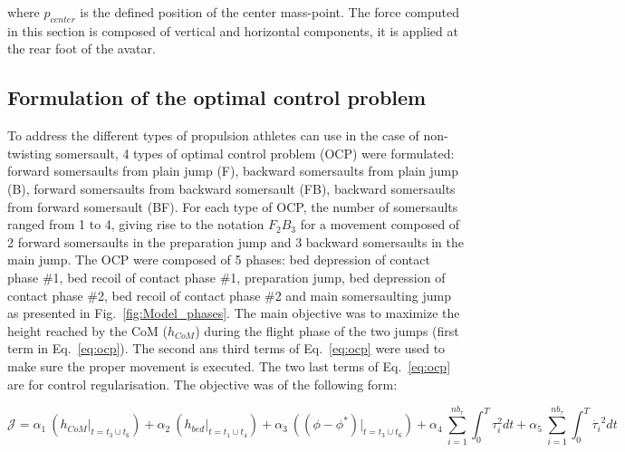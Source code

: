 \noindent where $p_{center}$ is the defined position of the center mass-point.
The force computed in this section is composed of vertical and horizontal components, it is applied at the rear foot of the avatar.




\subsection{Formulation of the optimal control problem}\label{subsec:2e}
To address the different types of propulsion athletes can use in the case of non-twisting somersault, 4 types of optimal control problem (OCP) were formulated: forward somersaults from plain jump (F), backward somersaults from plain jump (B), forward somersaults from backward somersault (FB), backward somersaults from forward somersault (BF).
For each type of OCP, the number of somersaults ranged from 1 to 4, giving rise to the notation $F_2B_3$ for a movement composed of 2 forward somersaults in the preparation jump and 3 backward somersaults in the main jump.
The OCP were composed of 5 phases: bed depression of contact phase \#1, bed recoil of contact phase \#1, preparation jump, bed depression of contact phase \#2, bed recoil of contact phase \#2 and main somersaulting jump as presented in Fig.~\ref{fig:Model_phases}.
The main objective was to maximize the height reached by the CoM ($h_{CoM}$) during the flight phase of the two jumps (first term in Eq.~\ref{eq:ocp}).
The second ans third terms of Eq.~\ref{eq:ocp} were used to make sure the proper movement is executed.
The two last terms of Eq.~\ref{eq:ocp} are for control regularisation.
The objective was of the following form:

\[
\mathcal{J} = \alpha_1~(h_{CoM} \big\rvert_{t = t_3 \cup t_6}) + \alpha_2~(h_{bed} \big\rvert_{t = t_1 \cup t_4}) + \alpha_3~((\phi - \phi^*) \big\rvert_{t = t_3 \cup t_6}) + \alpha_4~\sum_{i=1}^{nb_{\tau}} \int_0^T \tau_{i}^2 dt + \alpha_5~\sum_{i=1}^{nb_{\tau}}  \int_0^T \dot{\tau_{i}}^2 dt \label{eq:ocp}
\]

